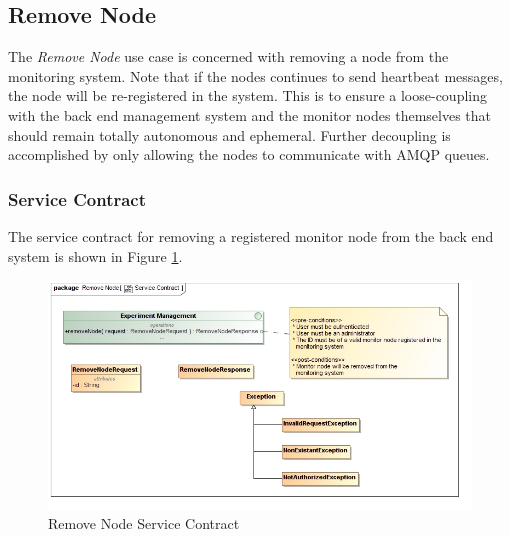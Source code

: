 \subsection {Remove Node}
The \textit{Remove Node} use case is concerned with removing a node from the
monitoring system. Note that if the nodes continues to send heartbeat messages,
the node will be re-registered in the system. This is to ensure a loose-coupling
with the back end management system and the monitor nodes themselves that should
remain totally autonomous and ephemeral. Further decoupling is accomplished by
only allowing the nodes to communicate with AMQP queues.

\subsubsection{Service Contract}
The service contract for removing a registered monitor node from the back end 
system is shown in Figure \ref{fig:removeNodeServiceContract}.
\begin{figure}[H]
  \begin{center}
  \includegraphics[scale=0.38]{../Diagrams and Charts/Experiment/Remove Node Service Contract.jpg}
  \caption{Remove Node Service Contract}
  \label{fig:removeNodeServiceContract}
  \end{center}
\end{figure}

